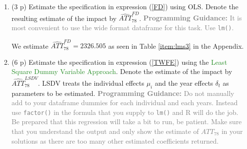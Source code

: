 \documentclass[
]{article}
\newenvironment{Shaded}{\begin{snugshade}}{\end{snugshade}}
\newcommand{\AttributeTok}[1]{\textcolor[rgb]{0.13,0.29,0.53}{#1}}
\newcommand{\FunctionTok}[1]{\textcolor[rgb]{0.13,0.29,0.53}{\textbf{#1}}}
\newcommand{\NormalTok}[1]{#1}
\newcommand{\OtherTok}[1]{\textcolor[rgb]{0.56,0.35,0.01}{#1}}
\newcommand{\SpecialCharTok}[1]{\textcolor[rgb]{0.81,0.36,0.00}{\textbf{#1}}}
\begin{document}
\begin{enumerate}
\def\labelenumi{\arabic{enumi}.}
\setcounter{enumi}{1}
\item
  (3 p) Estimate the specification in expression (\ref{FD}) using OLS.
  Denote the resulting estimate of the impact by
  \(\widehat{ATT}_{78}^{FD}\).
  \textcolor{gray}{\textbf{Programming Guidance:} It is most convenient to use the wide format dataframe for this task. Use \texttt{lm()}.}\label{item:fd}

\begin{Shaded}
\end{Shaded}

  We estimate \(\widehat{ATT}_{78}^{FD} = 2326.505\) as seen in Table
  \ref{item:lms3} in the Appendix.
\item
  (6 p) Estimate the specification in expression (\ref{TWFE}) using the
  \textcolor{ForestGreen}{Least Square Dummy Variable Approach}. Denote
  the estimate of the impact by \(\widehat{ATT}_{78}^{LSDV}\). LSDV
  treats the individual effects \(\mu_i\) and the year effects
  \(\delta_t\) as parameters to be estimated.
  \textcolor{Gray}{\textbf{Programming Guidance:} Do not manually add to your dataframe dummies for each individual and each years. Instead use \texttt{factor()} in the formula that you supply to \texttt{lm()} and R will do the job. Be prepared that this regression will take a bit to run, be patient. Make sure that you understand the output and only show the estimate of ${ATT}_{78}$ in your solutions as there are too many other estimated coefficients returned.}\label{item:lsdv}

\begin{Shaded}
\end{Shaded}


\end{enumerate}
\end{document}
